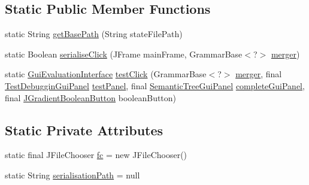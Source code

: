 \subsection*{Static Public Member Functions}
\begin{DoxyCompactItemize}
\item 
static String \hyperlink{classit_1_1emarolab_1_1cagg_1_1debugging_1_1DebuggingGui_1_1DebuggingStaticActioner_a445657f2ef3ba890da7196bfd297d00b}{get\-Base\-Path} (String state\-File\-Path)
\item 
static Boolean \hyperlink{classit_1_1emarolab_1_1cagg_1_1debugging_1_1DebuggingGui_1_1DebuggingStaticActioner_a6571fd8567e0aecafd2185c03ec2a587}{serialise\-Click} (J\-Frame main\-Frame, Grammar\-Base$<$?$>$ \hyperlink{classit_1_1emarolab_1_1cagg_1_1debugging_1_1DebuggingGui_a03d18ffb6d8ab6c84ad429c8dac4b886}{merger})
\item 
static \hyperlink{interfaceit_1_1emarolab_1_1cagg_1_1core_1_1evaluation_1_1interfacing_1_1GuiEvaluationInterface}{Gui\-Evaluation\-Interface} \hyperlink{classit_1_1emarolab_1_1cagg_1_1debugging_1_1DebuggingGui_1_1DebuggingStaticActioner_a4736589553d273e154d789a1ee42a394}{test\-Click} (Grammar\-Base$<$?$>$ \hyperlink{classit_1_1emarolab_1_1cagg_1_1debugging_1_1DebuggingGui_a03d18ffb6d8ab6c84ad429c8dac4b886}{merger}, final \hyperlink{classit_1_1emarolab_1_1cagg_1_1debugging_1_1baseComponents_1_1customPanel_1_1TestDebugginGuiPanel}{Test\-Debuggin\-Gui\-Panel} \hyperlink{classit_1_1emarolab_1_1cagg_1_1debugging_1_1DebuggingGui_a6c46d4da282f798650a68c5f638123ce}{test\-Panel}, final \hyperlink{classit_1_1emarolab_1_1cagg_1_1debugging_1_1baseComponents_1_1customPanel_1_1SemanticTreeGuiPanel}{Semantic\-Tree\-Gui\-Panel} \hyperlink{classit_1_1emarolab_1_1cagg_1_1debugging_1_1DebuggingGui_afb478af04b658db9dcb70d49150e8c08}{complete\-Gui\-Panel}, final \hyperlink{classit_1_1emarolab_1_1cagg_1_1debugging_1_1baseComponents_1_1JGradientBooleanButton}{J\-Gradient\-Boolean\-Button} boolean\-Button)
\end{DoxyCompactItemize}
\subsection*{Static Private Attributes}
\begin{DoxyCompactItemize}
\item 
static final J\-File\-Chooser \hyperlink{classit_1_1emarolab_1_1cagg_1_1debugging_1_1DebuggingGui_1_1DebuggingStaticActioner_a0ae81849fa689680e44d0b3eb4799d1c}{fc} = new J\-File\-Chooser()
\item 
static String \hyperlink{classit_1_1emarolab_1_1cagg_1_1debugging_1_1DebuggingGui_1_1DebuggingStaticActioner_a1b60d27a5e9869f6e975afd8cb6ab286}{serialisation\-Path} = null
\end{DoxyCompactItemize}


